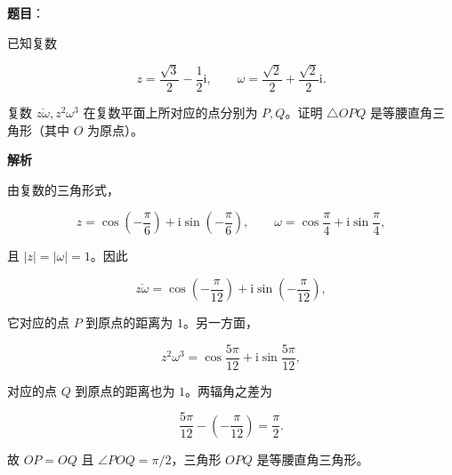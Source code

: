 \begin{answer}

\textbf{题目}：

已知复数

\nopagebreak[4]
\[
z=\dfrac{\sqrt3}{2}-\dfrac12\mathrm{i},\qquad
\omega=\dfrac{\sqrt2}{2}+\dfrac{\sqrt2}{2}\mathrm{i}.
\]

复数 $\overline{z\omega},z^2\omega^3$ 在复数平面上所对应的点分别为 $P,Q$。证明 $\triangle OPQ$ 是等腰直角三角形（其中 $O$ 为原点）。

\textbf{解析}

由复数的三角形式，

\nopagebreak[4]
\[
z=\cos\left(-\frac\pi6\right)+\mathrm{i}\sin\left(-\frac\pi6\right),
\qquad
\omega=\cos\frac\pi4+\mathrm{i}\sin\frac\pi4,
\]

且 $|z|=|\omega|=1$。因此

\nopagebreak[4]
\[
\overline{z\omega}
=\cos\left(-\frac\pi{12}\right)+\mathrm{i}\sin\left(-\frac\pi{12}\right),
\]

它对应的点 $P$ 到原点的距离为 $1$。另一方面，

\nopagebreak[4]
\[
z^2\omega^3
=\cos\frac{5\pi}{12}+\mathrm{i}\sin\frac{5\pi}{12},
\]

对应的点 $Q$ 到原点的距离也为 $1$。两辐角之差为

\nopagebreak[4]
\[
\frac{5\pi}{12}-\left(-\frac\pi{12}\right)=\frac\pi2.
\]

故 $OP=OQ$ 且 $\angle POQ=\pi/2$，三角形 $OPQ$ 是等腰直角三角形。


\end{answer}
